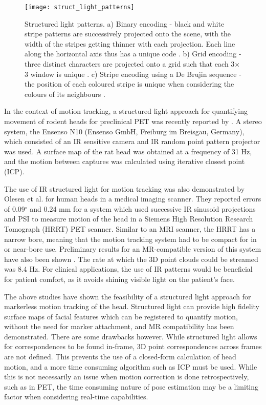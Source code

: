 \documentclass[class=article, crop=false]{standalone}
\begin{document}
\begin{figure}
	\centering
	\texttt{[image: struct\_light\_patterns]}
	\caption{Structured light patterns. a) Binary encoding - black and white stripe patterns are successively projected onto the scene, with the width of the stripes getting thinner with each projection. Each line along the horizontal axis thus has a unique code \parencite{Geng2011}. b) Grid encoding - three distinct characters are projected onto a grid such that each 3$\times$3 window is unique \parencite{Albitar2006}. c) Stripe encoding using a De Brujin sequence - the position of each coloured stripe is unique when considering the colours of its neighbours \parencite{Zhang2002}. }
	\label{struct_patterns}
\end{figure}

\par
In the context of motion tracking, a structured light approach for quantifying movement of rodent heads for preclinical PET was recently reported by \cite{Miranda2017}. A stereo system, the Ensenso N10 (Ensenso GmbH, Freiburg im Breisgau, Germany), which consisted of an IR sensitive camera and IR random point pattern projector was used. A surface map of the rat head was obtained at a frequency of 31 Hz, and the motion between captures was calculated using iterative closest point (ICP).
\par 
The use of IR structured light for motion tracking was also demonstrated by Olesen et al. \parencite*{Olesen2012} for human heads in a medical imaging scanner. They reported errors of 0.09$^{\circ}$ and 0.24 mm for a system which used successive IR sinusoid projections and PSI to measure motion of the head in a Siemens High Resolution Research Tomograph (HRRT) PET scanner. Similar to an MRI scanner, the HRRT has a narrow bore, meaning that the motion tracking system had to be compact for in or near-bore use. Preliminary results for an MR-compatible version of this system have also been shown \parencite{Olesen2015a}. The rate at which the 3D point clouds could be streamed was 8.4 Hz. For clinical applications, the use of IR patterns would be beneficial for patient comfort, as it avoids shining visible light on the patient's face.
\par
The above studies have shown the feasibility of a structured light approach for markerless motion tracking of the head. Structured light can provide high fidelity surface maps of facial features which can be registered to quantify motion, without the need for marker attachment, and MR compatibility has been demonstrated. There are some drawbacks however. While structured light allows for correspondences to be found in-frame, 3D point correspondences across frames are not defined. This prevents the use of a closed-form calculation of head motion, and a more time consuming algorithm such as ICP must be used. While this is not necessarily an issue when motion correction is done retrospectively, such as in PET, the time consuming nature of pose estimation may be a limiting factor when considering real-time capabilities.
\end{document}
